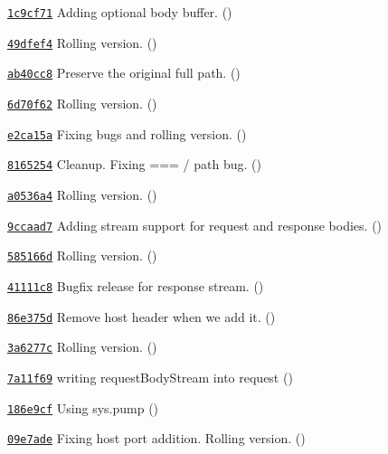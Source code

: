 \begin{DoxyItemize}
\item \href{https://github.com/mikeal/request/commit/1c9cf719c92b02ba85c4e47bd2b92a3303cbe1cf}{\tt 1c9cf71} Adding optional body buffer. ()
\item \href{https://github.com/mikeal/request/commit/49dfef42630c4fda6fb208534c00638dc0f06a6b}{\tt 49dfef4} Rolling version. ()
\item \href{https://github.com/mikeal/request/commit/ab40cc850652e325fcc3b0a44ee7303ae0a7b77f}{\tt ab40cc8} Preserve the original full path. ()
\item \href{https://github.com/mikeal/request/commit/6d70f62c356f18098ca738b3dbedcf212ac3d8d8}{\tt 6d70f62} Rolling version. ()
\item \href{https://github.com/mikeal/request/commit/e2ca15a0f7e986e3063977ee9bd2eb69e86bdb1f}{\tt e2ca15a} Fixing bugs and rolling version. ()
\item \href{https://github.com/mikeal/request/commit/81652543d3a09553cbf33095a7932dec53ccecc2}{\tt 8165254} Cleanup. Fixing \textquotesingle{}\textquotesingle{} === \textquotesingle{}/\textquotesingle{} path bug. ()
\item \href{https://github.com/mikeal/request/commit/a0536a46d0b91e204fbde1e4341461bc827c9542}{\tt a0536a4} Rolling version. ()
\item \href{https://github.com/mikeal/request/commit/9ccaad7dce05e5dcc3eacaf1500404622a0d8067}{\tt 9ccaad7} Adding stream support for request and response bodies. ()
\item \href{https://github.com/mikeal/request/commit/585166d979d4476e460e9835cc0516d04a9a3e11}{\tt 585166d} Rolling version. ()
\item \href{https://github.com/mikeal/request/commit/41111c88d711da80ea123df238d62038b89769bf}{\tt 41111c8} Bugfix release for response stream. ()
\item \href{https://github.com/mikeal/request/commit/86e375d093700affe4d6d2b76a7acedbe8da140c}{\tt 86e375d} Remove host header when we add it. ()
\item \href{https://github.com/mikeal/request/commit/3a6277c81cfd3457c760f2aaea44852ef832a1e8}{\tt 3a6277c} Rolling version. ()
\item \href{https://github.com/mikeal/request/commit/7a11f69d5353ecc1319e2e91ca4aefbaf0338136}{\tt 7a11f69} writing request\+Body\+Stream into request ()
\item \href{https://github.com/mikeal/request/commit/186e9cf692511d768f8016d311609a0a0a315af6}{\tt 186e9cf} Using sys.\+pump ()
\item \href{https://github.com/mikeal/request/commit/09e7ade541e1d40316a3f153128871a353e707b1}{\tt 09e7ade} Fixing host port addition. Rolling version. ()

\end{DoxyItemize}
